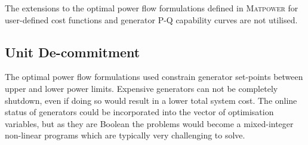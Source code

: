 The extensions to the optimal power flow formulations defined in
\textsc{Matpower} for user-defined cost functions and generator P-Q capability
curves are not utilised.

%

\subsection{Unit De-commitment}
\label{sec:decommit}
The optimal power flow formulations used constrain generator set-points
between upper and lower power limits.  Expensive generators can not be
completely shutdown, even if doing so would result in a lower total system
cost.  The online status of generators could be incorporated into the vector of
optimisation variables, but as they are Boolean the problems would become a
mixed-integer non-linear programs which are typically very challenging to
solve.

